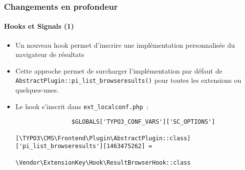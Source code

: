 \begin{frame}[fragile]
	\frametitle{Changements en profondeur}
	\framesubtitle{Hooks et Signals (1)}

	\lstset{basicstyle=\tiny\ttfamily}

	\begin{itemize}

		\item Un nouveau hook permet d'inscrire une implémentation personnalisée du navigateur de résultats

		\item Cette approche permet de surcharger l'implémentation par défaut de
			\texttt{AbstractPlugin::pi\_list\_browseresults()}
			pour toutes les extensions ou quelques-unes.

		\item Le hook s'inscrit dans \texttt{ext\_localconf.php}~:

			\begin{lstlisting}
				$GLOBALS['TYPO3_CONF_VARS']['SC_OPTIONS']
				  [\TYPO3\CMS\Frontend\Plugin\AbstractPlugin::class]['pi_list_browseresults'][1463475262] =
				  \Vendor\ExtensionKey\Hook\ResultBrowserHook::class
			\end{lstlisting}

	\end{itemize}

\end{frame}


